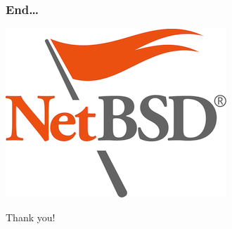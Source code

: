 \documentclass[dvipsnames,table]{beamer}
\begin{document}
\begin{frame}
\frametitle{End\ldots}
\vspace*{-0.8cm}
\begin{center}
\includegraphics[scale=0.5]{NetBSD.png}

Thank you!
\end{center}
\end{frame}

 
\end{document}

